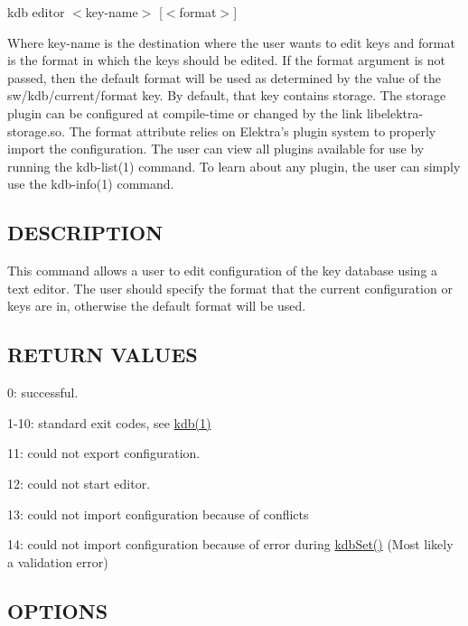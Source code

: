 {\ttfamily kdb editor $<$key-\/name$>$ \mbox{[}$<$format$>$\mbox{]}}

Where {\ttfamily key-\/name} is the destination where the user wants to edit keys and {\ttfamily format} is the format in which the keys should be edited. If the {\ttfamily format} argument is not passed, then the default format will be used as determined by the value of the {\ttfamily sw/kdb/current/format} key. By default, that key contains {\ttfamily storage}. The {\ttfamily storage} plugin can be configured at compile-\/time or changed by the link {\ttfamily libelektra-\/storage.\+so}. The {\ttfamily format} attribute relies on Elektra's plugin system to properly import the configuration. The user can view all plugins available for use by running the kdb-\/list(1) command. To learn about any plugin, the user can simply use the kdb-\/info(1) command.

\subsection*{D\+E\+S\+C\+R\+I\+P\+T\+I\+O\+N}

This command allows a user to edit configuration of the key database using a text editor. The user should specify the format that the current configuration or keys are in, otherwise the default format will be used.

\subsection*{R\+E\+T\+U\+R\+N V\+A\+L\+U\+E\+S}


\begin{DoxyItemize}
\item 0\+: successful.
\item 1-\/10\+: standard exit codes, see \hyperlink{md_doc_help_kdb_doc_help_kdb_md}{kdb(1)}
\item 11\+: could not export configuration.
\item 12\+: could not start editor.
\item 13\+: could not import configuration because of conflicts
\item 14\+: could not import configuration because of error during \hyperlink{group__kdb_ga11436b058408f83d303ca5e996832bcf}{kdb\+Set()} (Most likely a validation error)
\end{DoxyItemize}

\subsection*{O\+P\+T\+I\+O\+N\+S}


